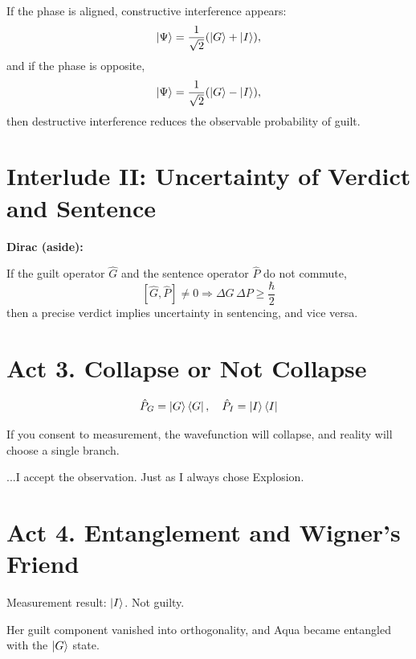 \documentclass[12pt]{article}
\begin{document}
\begin{tcolorbox}[title=Dirac:]
If the phase is aligned, constructive interference appears:
\[
\ket{\Psi} = \frac{1}{\sqrt{2}}(\ket{G} + \ket{I}),
\]
and if the phase is opposite,
\[
\ket{\Psi} = \frac{1}{\sqrt{2}}(\ket{G} - \ket{I}),
\]
then destructive interference reduces the observable probability of guilt\cite{griffiths2018introduction}.
\end{tcolorbox}

\section*{Interlude II: Uncertainty of Verdict and Sentence}

\textbf{Dirac (aside):}

If the guilt operator $\hat{G}$ and the sentence operator $\hat{P}$ do not commute\cite{griffiths2018introduction},
\[
[\hat{G}, \hat{P}] \neq 0 \Rightarrow \Delta G \, \Delta P \geq \frac{\hbar}{2}
\]
then a precise verdict implies uncertainty in sentencing, and vice versa.

\section*{Act 3. Collapse or Not Collapse}

\[
\hat{P}_{G} = \ket{G}\bra{G}, \quad \hat{P}_{I} = \ket{I}\bra{I}
\]

\begin{tcolorbox}[title=Dirac:]
If you consent to measurement, the wavefunction will collapse\cite{neumann1955mathematical}, and reality will choose a single branch.
\end{tcolorbox}

\begin{tcolorbox}[title=Megumin:]
...I accept the observation. Just as I always chose Explosion.
\end{tcolorbox}

\section*{Act 4. Entanglement and Wigner's Friend}

\begin{tcolorbox}[title=Judge Slaanesh:]
Measurement result: $\ket{I}$. Not guilty.
\end{tcolorbox}

\begin{tcolorbox}[title=Dirac:]
Her guilt component vanished into orthogonality, and Aqua became entangled with the $\ket{G}$ state\cite{nielsen2010quantum}.
\end{tcolorbox}
\end{document}
